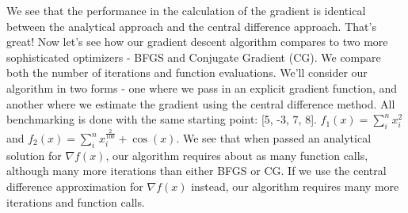 \documentclass[10pt]{article}
\begin{document}
We see that the performance in the calculation of the gradient is identical between the analytical approach and the central difference approach. That's great! Now let's see how our gradient descent algorithm compares to two more sophisticated optimizers - BFGS and Conjugate Gradient (CG). We compare both the number of iterations and function evaluations. We'll consider our algorithm in two forms - one where we pass in an explicit gradient function, and another where we estimate the gradient using the central difference method. All benchmarking is done with the same starting point: [5, -3, 7, 8]. $f_1(x) =  \sum_i^n x_i^2$ and $f_2(x) = \sum_i^n x_i^{\frac{2}{100}} + \cos(x)$. We see that when passed an analytical solution for $\nabla f(x)$, our algorithm requires about as many function calls, although many more iterations than either BFGS or CG. If we use the central difference approximation for $\nabla f(x)$ instead, our algorithm requires many more iterations and function calls.
\end{document}
